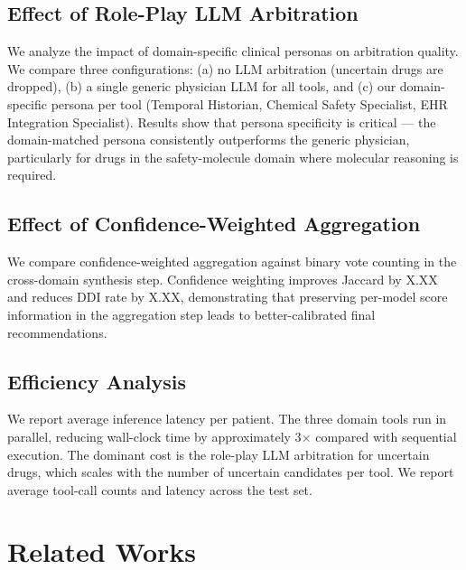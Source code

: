 \documentclass[sigconf,anonymous]{acmart}
\begin{document}
\subsection{Effect of Role-Play LLM Arbitration}


We analyze the impact of domain-specific clinical personas on arbitration quality. We compare three configurations: (a) no LLM arbitration (uncertain drugs are dropped), (b) a single generic physician LLM for all tools, and (c) our domain-specific persona per tool (Temporal Historian, Chemical Safety Specialist, EHR Integration Specialist). Results show that persona specificity is critical — the domain-matched persona consistently outperforms the generic physician, particularly for drugs in the safety-molecule domain where molecular reasoning is required.

\subsection{Effect of Confidence-Weighted Aggregation}


We compare confidence-weighted aggregation against binary vote counting in the cross-domain synthesis step. Confidence weighting improves Jaccard by X.XX and reduces DDI rate by X.XX, demonstrating that preserving per-model score information in the aggregation step leads to better-calibrated final recommendations.

\subsection{Efficiency Analysis}


We report average inference latency per patient. The three domain tools run in parallel, reducing wall-clock time by approximately 3$\times$ compared with sequential execution. The dominant cost is the role-play LLM arbitration for uncertain drugs, which scales with the number of uncertain candidates per tool. We report average tool-call counts and latency across the test set.


\section{Related Works}
\end{document}
